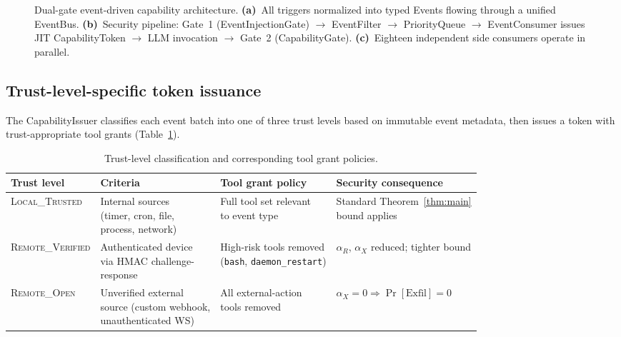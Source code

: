 \documentclass[pdflatex,sn-nature]{sn-jnl}%
\theoremstyle{thmstyleone}%
\theoremstyle{thmstyletwo}%
\theoremstyle{thmstylethree}%
\begin{document}
\begin{figure}[ht]
\centering
\caption{Dual-gate event-driven capability architecture. \textbf{(a)}~All triggers normalized into typed Events flowing through a unified EventBus. \textbf{(b)}~Security pipeline: Gate~1 (EventInjectionGate) $\to$ EventFilter $\to$ PriorityQueue $\to$ EventConsumer issues JIT CapabilityToken $\to$ LLM invocation $\to$ Gate~2 (CapabilityGate). \textbf{(c)}~Eighteen independent side consumers operate in parallel.}
\label{fig:arch}
\end{figure}

\subsection{Trust-level-specific token issuance}\label{subsec:trust}

The CapabilityIssuer classifies each event batch into one of three trust levels based on immutable event metadata, then issues a token with trust-appropriate tool grants (Table~\ref{tab:trust}).

\begin{table}[ht]
\caption{Trust-level classification and corresponding tool grant policies.}\label{tab:trust}
\begin{tabular}{@{}llll@{}}
\toprule
Trust level & Criteria & Tool grant policy & Security consequence \\
\midrule
\textsc{Local\_Trusted} & \makecell[l]{Internal sources\\(timer, cron, file,\\process, network)} & \makecell[l]{Full tool set relevant\\to event type} & \makecell[l]{Standard Theorem~\ref{thm:main}\\bound applies} \\[6pt]
\textsc{Remote\_Verified} & \makecell[l]{Authenticated device\\via HMAC challenge-\\response} & \makecell[l]{High-risk tools removed\\(\texttt{bash}, \texttt{daemon\_restart})} & \makecell[l]{$\alpha_R$, $\alpha_X$ reduced;\\tighter bound} \\[6pt]
\textsc{Remote\_Open} & \makecell[l]{Unverified external\\source (custom webhook,\\unauthenticated WS)} & \makecell[l]{All external-action\\tools removed} & $\alpha_X = 0 \Rightarrow \Pr[\text{Exfil}] = 0$ \\
\bottomrule
\end{tabular}
\end{table}
\end{document}
